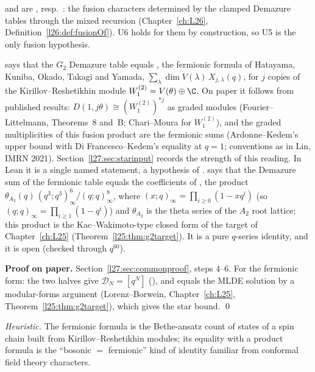 \begin{dictionary}
 and  are , resp.\ :
the fusion characters determined by the clamped Demazure tables through the mixed recursion (Chapter~\ref{ch:L26},
Definition~\ref{l26:def:fusionOf}). U6 holds for them by construction, so U5 is the only fusion hypothesis.

 says that the $G_2$ Demazure table equals , the fermionic formula of Hatayama, Kuniba, Okado,
Takagi and Yamada, $\sum_\lambda\dim V(\lambda)\,X_{j,\lambda}(q)$, for $j$ copies of the Kirillov--Reshetikhin module $W^{(2)}_1=V(\theta)\oplus\C$.
On paper it follows from published results: $D(1,j\theta)\cong(W^{(2)}_1)^{*j}$ as graded modules (Fourier--Littelmann, Theorems~8
and~B; Chari--Moura for $W^{(2)}_1$), and the graded multiplicities of this fusion product are the fermionic sums (Ardonne--Kedem's upper
bound with Di Francesco--Kedem's equality at $q=1$; conventions as in Lin, IMRN 2021). Section~\ref{l27:sec:starinput} records the
strength of this reading. In Lean it is a single named statement, a hypothesis of .  says that the Demazure sum of
the fermionic table equals the coefficients of , the product
$\theta_{A_2}(q)\,(q^3;q^3)_\infty^6/(q;q)_\infty^8$, where $(x;q)_\infty=\prod_{i\ge0}(1-xq^i)$ (so $(q;q)_\infty=\prod_{i\ge1}(1-q^i)$) and
$\theta_{A_2}$ is the theta series of the $A_2$ root lattice; this product is the Kac--Wakimoto-type closed form of the target of
Chapter~\ref{ch:L25} (Theorem~\ref{l25:thm:g2target}). It is a pure $q$-series identity, and it is open (checked through $q^{60}$).
\end{dictionary}

\textbf{Proof on paper.} Section~\ref{l27:sec:commonproof}, steps 4--6. For the fermionic form: the two halves give
$\mathcal D_N=[q^N]$ (), and  equals the MLDE solution by a modular-forms argument
(Lorenz--Borwein, Chapter~\ref{ch:L25}, Theorem~\ref{l25:thm:g2target}), which gives the star bound. \qed

\begin{physics}
\emph{Heuristic.} The fermionic formula is the Bethe-ansatz count of states of a spin chain built from Kirillov--Reshetikhin modules; its
equality with a product formula is the ``bosonic $=$ fermionic'' kind of identity familiar from conformal field theory characters.
\end{physics}

